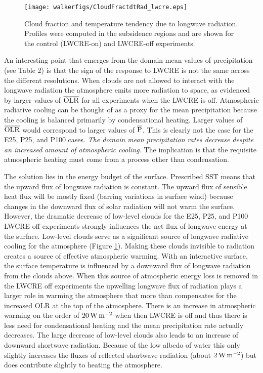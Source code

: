 \documentclass[draft]{agujournal2019}
\begin{document}
\begin{figure}
  \centering
      \texttt{[image: walkerfigs/CloudFractdtRad\_lwcre.eps]}
  \caption{Cloud fraction and temperature tendency due to longwave radiation.  Profiles were computed in the 
  subsidence regions and are shown for the control (LWCRE-on) and LWCRE-off experiments.}
  \label{fig:cf_tdtlw}
\end{figure}

An interesting point that emerges from the domain mean values of precipitation (see Table 2) 
is that the sign of the response to LWCRE is not the same across the different resolutions.
When clouds are not allowed to interact with the longwave radiation the atmosphere 
emits more radiation to space, as evidenced by larger values of $\overline{\rm{OLR}}$ 
for all experiments when the LWCRE is off.  Atmospheric radiative cooling can be thought of 
as a proxy for the mean precipitation because the cooling is balanced primarily by 
condensational heating.  Larger values of $\overline{\rm{OLR}}$ would correspond to 
larger values of $\overline{\rm{P}}$.  This is clearly not the case for the E25, P25, and 
P100 cases.   \textit{The domain mean precipitation rates decrease despite an increased 
amount of atmospheric cooling.}  The implication is that the requisite atmospheric heating 
must come from a process other than condensation.  

The solution lies in the energy budget of the surface.  Prescribed SST means that the upward flux of 
longwave radiation is constant.  The upward flux of sensible heat flux will be mostly fixed 
(barring variations in surface
wind) because changes in the downward flux of solar radiation will not warm the surface.  
However, the dramatic decrease of low-level clouds for the E25, P25, and P100 LWCRE off 
experiments strongly influences the net flux of longwave energy at the surface. 
Low-level clouds serve as a significant source of longwave radiative cooling 
for the atmosphere (Figure \ref{fig:cf_tdtlw}).  Making these clouds invisible to radiation creates 
a source of effective atmospheric warming.  
With an interactive surface, the surface temperature is influenced
by a downward flux of longwave radiation from the clouds above.  
When this source of atmospheric energy loss is removed in the LWCRE off experiments 
the upwelling longwave flux of radiation plays a larger role in warming the atmosphere that more 
than compensates for the increased OLR at the top of the atmosphere.  There is an increase in 
atmospheric warming on 
the order of $20 \, \rm{W \,m^{-2}}$ when then LWCRE is off and thus there is less need for 
condensational heating and the mean precipitation rate actually decreases.  
The large decrease of low-level clouds also leads to an increase of downward shortwave 
radiation.  Because of the low albedo of water
this only slightly increases the fluxes of reflected shortwave radiation (about $2 \, \rm{W \,m^{-2}}$) 
but does contribute slightly to heating the atmosphere.
\end{document}
